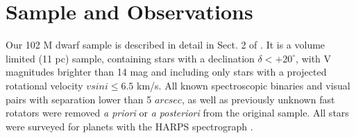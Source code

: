 \documentclass[structabstract]{aa}
\begin{document}











%












\section{Sample and Observations}
\label{sample}

Our 102 M dwarf sample is described in detail in Sect. 2 of \citet{Bonfils-2011}. It is a volume limited (11 pc) sample, containing stars with a declination $\delta< +20^{\circ}$, with V magnitudes brighter than 14  mag and including only stars with a projected rotational velocity $vsini\le 6.5$ km/s. All known spectroscopic binaries and visual pairs with separation lower than 5 $arcsec$, as well as previously unknown fast rotators were removed \textit{a priori} or \textit{a posteriori} from the original sample. All stars were surveyed for planets with the HARPS spectrograph \citep{Mayor-2003b}.
\end{document}
